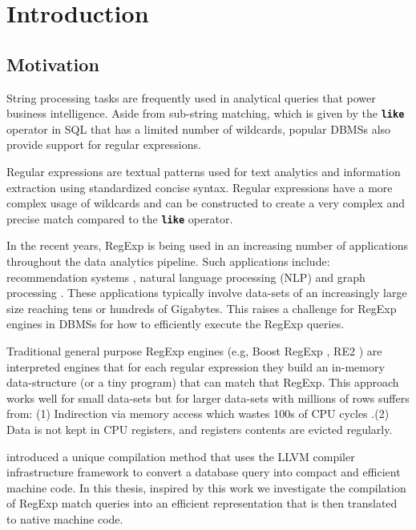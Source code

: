 
\chapter{Introduction}\label{chapter:introduction}

\section{Motivation}
String processing tasks are frequently used in analytical queries that power business intelligence. Aside from sub-string matching, which is given by the \texttt{\textbf{like}} operator in SQL that has a limited number of wildcards, popular DBMSs also provide support for regular expressions.

Regular expressions are textual patterns used for text analytics and information extraction using standardized concise syntax. Regular expressions have a more complex usage of wildcards and can be constructed to create a very complex and precise match compared to the \texttt{\textbf{like}} operator.

In the recent years, RegExp is being used in an increasing number of applications throughout the data analytics pipeline. Such applications include: recommendation systems \cite{recsys1}, natural language processing (NLP) \cite{nlp1, nlp2} and graph processing \cite{graph1}. These applications typically involve data-sets of an increasingly large size reaching tens or hundreds of Gigabytes. This raises a challenge for RegExp engines in DBMSs for how to efficiently execute the RegExp queries.

Traditional general purpose RegExp engines (e.g, Boost RegExp \cite{Boost}, RE2 \cite{re2}) are interpreted engines  that for each regular expression they build an in-memory data-structure (or a tiny program) that can match that RegExp. This approach works well for small data-sets but for larger data-sets with millions of rows suffers from: (1) Indirection via memory access which wastes 100s of CPU cycles \cite{cpumemgap}.(2) Data is not kept in CPU registers, and registers contents are evicted regularly.

\citet{querycomp} introduced a unique compilation method that uses the LLVM \cite{llvm} compiler infrastructure framework to convert a database query into compact and efficient machine code. In this thesis, inspired by this work we investigate the compilation of RegExp match queries into an efficient representation that is then translated to native machine code. 

